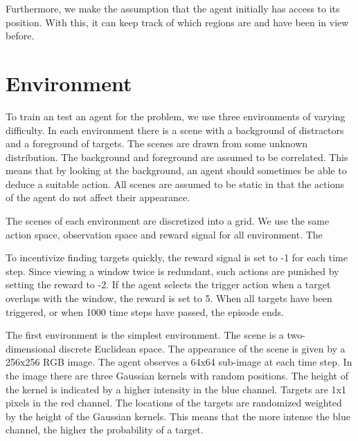 Furthermore, we make the assumption that the agent initially has access to its position.
With this, it can keep track of which regions are and have been in view before.


\section{Environment}
\label{sec:environment}

To train an test an agent for the problem, we use three environments of varying difficulty.
In each environment there is a scene with a background of distractors and a foreground of targets.
The scenes are drawn from some unknown distribution.
The background and foreground are assumed to be correlated.
This means that by looking at the background, an agent should sometimes be able to deduce a suitable action.
All scenes are assumed to be static in that the actions of the agent do not affect their appearance.

The scenes of each environment are discretized into a grid.
We use the same action space, observation space and reward signal for all environment.
The 


To incentivize finding targets quickly, the reward signal is set to -1 for each time step.
Since viewing a window twice is redundant, such actions are punished by setting the reward to -2.
If the agent selects the trigger action when a target overlaps with the window, the reward is set to 5.
When all targets have been triggered, or when 1000 time steps have passed, the episode ends.

The first environment is the simplest environment. 
The scene is a two-dimensional discrete Euclidean space.
The appearance of the scene is given by a 256x256 RGB image.
The agent observes a 64x64 sub-image at each time step.
In the image there are three Gaussian kernels with random positions.
The height of the kernel is indicated by a higher intensity in the blue channel.
Targets are 1x1 pixels in the red channel.
The locations of the targets are randomized weighted by the height of the Gaussian kernels.
This means that the more intense the blue channel, the higher the probability of a target.

